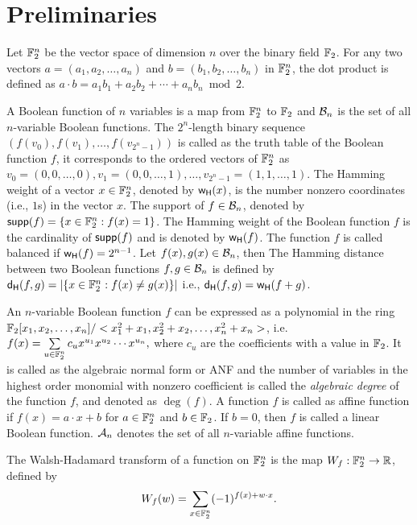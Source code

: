 \documentclass{llncs}
\begin{document}
\section{Preliminaries}\label{sec:prel}
Let $\mathbb{F}_2^n$ be the vector space of dimension $n$ over the binary field $\mathbb{F}_2$. For any two vectors $a=(a_1, a_2, \ldots, a_n)$ and $b = (b_1, b_2, \ldots, b_n)$ in $\mathbb{F}_2^n$, the dot product is defined as $a\cdot b = a_1 b_1 + a_2 b_2 + \cdots + a_nb_n \bmod 2$.

A Boolean function of $n$ variables is a map from $\mathbb{F}_2^n$ to $\mathbb{F}_2$ and $\mathcal{B}_n$ is the set of all $n$-variable Boolean functions. 
The $2^n$-length binary sequence $(f(v_0), f(v_1), \ldots, f(v_{2^n-1}))$ is called as the truth table of the Boolean function $f$, it corresponds to the ordered vectors of $\mathbb{F}_2^n$ as $v_0 = (0,0,\ldots,0), v_1= (0,0,\ldots,1),\ldots, v_{2^n-1}=(1,1,\ldots,1)$. 
The Hamming weight of a vector $x \in \mathbb{F}_2^n$, denoted by $\mathsf{w_H}(x)$, is the number nonzero coordinates (i.e., $1$s) in the vector $x$. The support of $f \in \mathcal{B}_n$, denoted by $\mathsf{supp}(f)= \{x \in \mathbb{F}_2^n : f(x) = 1\}$. The Hamming weight of the Boolean function $f$ is the cardinality of $\mathsf{supp}(f)$ and is denoted by $\mathsf{w_H}(f)$. The function $f$ is called balanced if $\mathsf{w_H}(f)= 2^{n-1}$. Let $f(x), g(x) \in \mathcal{B}_n$, then 
The Hamming distance between two Boolean functions $f, g \in \mathcal{B}_n$ is defined by $\mathsf{d_H}(f,g) = |\{x \in \mathbb{F}_2^n : f(x) \neq g(x) \}|$  i.e., $\mathsf{d_H}(f,g) = \mathsf{w_H}(f + g)$.

An $n$-variable Boolean function $f$ can be expressed as a polynomial in the ring $\mathbb{F}_2[x_1,x_2,\ldots,x_n]/<x_1^2+x_1,x_2^2+x_2,\ldots,x_n^2+x_n>$, i.e. 
$f(x) = \sum\limits_{u \in \mathbb{F}_2^n}c_u x^{u_1}x^{u_2}\cdots x^{u_n},$
where $c_u$ are the coefficients with a value in $\mathbb{F}_2$.
It is called as the algebraic normal form or ANF and the number of variables in the highest order monomial with nonzero coefficient is called the \textit{algebraic degree} of the function $f$, and denoted as $\deg(f)$.
A function $f$ is called as affine function if $f(x)= a\cdot x + b$ for $a \in \mathbb{F}_2^n$ and $b \in \mathbb{F}_2$. If $b=0$, then $f$ is called a linear Boolean function. $\mathcal{A}_n$ denotes the set of all $n$-variable affine functions. 

\begin{definition}\label{def:Walsh}
The Walsh-Hadamard transform of a function on $\mathbb{F}_2^n$ is the map $W_f : \mathbb{F}_2^n \to \mathbb{R}$, defined by \[W_{f}(w)= \sum_{x \in \mathbb{F}_2^n} (-1)^{f(x)+ w \cdot x}.\]
\end{definition}
\end{document}

